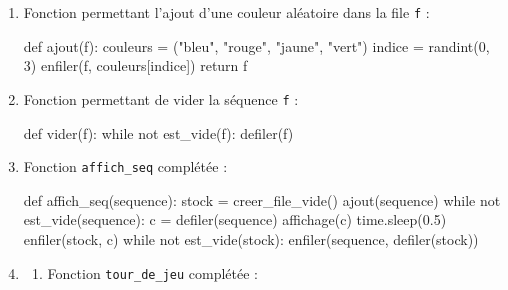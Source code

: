 \documentclass[
  letterpaper,
  DIV=11,
  numbers=noendperiod]{scrartcl}
\newenvironment{Shaded}{\begin{snugshade}}{\end{snugshade}}
\newcommand{\ControlFlowTok}[1]{\textcolor[rgb]{0.00,0.23,0.31}{#1}}
\newcommand{\DecValTok}[1]{\textcolor[rgb]{0.68,0.00,0.00}{#1}}
\newcommand{\FloatTok}[1]{\textcolor[rgb]{0.68,0.00,0.00}{#1}}
\newcommand{\KeywordTok}[1]{\textcolor[rgb]{0.00,0.23,0.31}{#1}}
\newcommand{\NormalTok}[1]{\textcolor[rgb]{0.00,0.23,0.31}{#1}}
\newcommand{\OperatorTok}[1]{\textcolor[rgb]{0.37,0.37,0.37}{#1}}
\newcommand{\StringTok}[1]{\textcolor[rgb]{0.13,0.47,0.30}{#1}}
\providecommand{\tightlist}{%
  \setlength{\itemsep}{0pt}\setlength{\parskip}{0pt}}\usepackage{longtable,booktabs,array}
\begin{document}
\begin{enumerate}
\def\labelenumi{\arabic{enumi}.}
\item
  Fonction permettant l'ajout d'une couleur aléatoire dans la file
  \texttt{f} :

\begin{Shaded}
\begin{Highlighting}[]
\KeywordTok{def}\NormalTok{ ajout(f):}
\NormalTok{    couleurs }\OperatorTok{=}\NormalTok{ (}\StringTok{"bleu"}\NormalTok{, }\StringTok{"rouge"}\NormalTok{, }\StringTok{"jaune"}\NormalTok{, }\StringTok{"vert"}\NormalTok{)}
\NormalTok{    indice }\OperatorTok{=}\NormalTok{ randint(}\DecValTok{0}\NormalTok{, }\DecValTok{3}\NormalTok{)}
\NormalTok{    enfiler(f, couleurs[indice])}
    \ControlFlowTok{return}\NormalTok{ f}
\end{Highlighting}
\end{Shaded}
\item
  Fonction permettant de vider la séquence \texttt{f} :

\begin{Shaded}
\begin{Highlighting}[]
\KeywordTok{def}\NormalTok{ vider(f):}
    \ControlFlowTok{while} \KeywordTok{not}\NormalTok{ est\_vide(f):}
\NormalTok{        defiler(f)}
\end{Highlighting}
\end{Shaded}
\item
  Fonction \texttt{affich\_seq} complétée :

\begin{Shaded}
\begin{Highlighting}[]
\KeywordTok{def}\NormalTok{ affich\_seq(sequence):}
\NormalTok{    stock }\OperatorTok{=}\NormalTok{ creer\_file\_vide()}
\NormalTok{    ajout(sequence)}
    \ControlFlowTok{while} \KeywordTok{not}\NormalTok{ est\_vide(sequence):}
\NormalTok{        c }\OperatorTok{=}\NormalTok{ defiler(sequence)}
\NormalTok{        affichage(c)}
\NormalTok{        time.sleep(}\FloatTok{0.5}\NormalTok{)}
\NormalTok{        enfiler(stock, c)}
    \ControlFlowTok{while} \KeywordTok{not}\NormalTok{ est\_vide(stock):}
\NormalTok{        enfiler(sequence, defiler(stock))}
\end{Highlighting}
\end{Shaded}
\item
  \begin{enumerate}
  \def\labelenumii{\alph{enumii}.}
  \tightlist
  \item
    Fonction \texttt{tour\_de\_jeu} complétée :
  \end{enumerate}


\end{enumerate}
\end{document}
